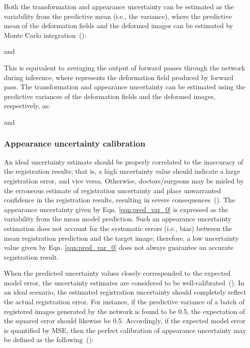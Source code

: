 \documentclass[times,twocolumn,final]{elsarticle}
\begin{document}
Both the transformation and appearance uncertainty can be estimated as the variability from the predictive mean (i.e., the variance), where the predictive mean of the deformation fields and the deformed images can be estimated by Monte Carlo integration~(\cite{gal2016dropout}):
\begin{linenomath}

\end{linenomath}
and
\begin{linenomath}

\end{linenomath}
This is equivalent to averaging the output of  forward passes through the network during inference, where  represents the deformation field produced by  forward pass. The transformation and appearance uncertainty can be estimated using the predictive variances of the deformation fields and the deformed images, respectively, as:
\begin{linenomath}

\end{linenomath}
and
\begin{linenomath}

\end{linenomath}
\subsubsection{Appearance uncertainty calibration}
\label{sec:uncert_cal}
An ideal uncertainty estimate should be properly correlated to the inaccuracy of the registration results; that is, a high uncertainty value should indicate a large registration error, and vice versa. Otherwise, doctors/surgeons may be misled by the erroneous estimate of registration uncertainty and place unwarranted confidence in the registration results, resulting in severe consequences~(\cite{luo2019applicability, risholm2013bayesian, risholm2011estimation}). The appearance uncertainty given by Eqn. \ref{eqn:pred_var_0} is expressed as the variability from the mean model prediction. Such an appearance uncertainty estimation does not account for the systematic errors (i.e., bias) between the mean registration prediction and the target image; therefore, a low uncertainty value given by Eqn. \ref{eqn:pred_var_0} does not always guarantee an accurate registration result.

When the predicted uncertainty values closely corresponded to the expected model error, the uncertainty estimates are considered to be well-calibrated~(\cite{laves2019well, levi2019evaluating}). In an ideal scenario, the estimated registration uncertainty should completely reflect the actual registration error. For instance, if the predictive variance of a batch of registered images generated by the network is found to be 0.5, the expectation of the squared error should likewise be 0.5. Accordingly, if the expected model error is quantified by MSE, then the perfect calibration of appearance uncertainty may be defined as the following~(\cite{guo2017calibration,levi2019evaluating, laves2020uncertainty}):
\begin{linenomath}

\end{linenomath}
\end{document}

